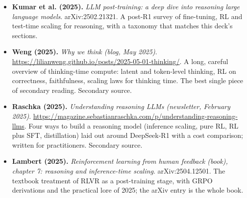 \documentclass[11pt,letterpaper]{article}
\begin{document}
\begin{itemize}[leftmargin=1.2em,itemsep=3pt]
\item \textbf{Kumar et al. (2025).} \textit{LLM post-training: a deep dive into reasoning large language models}. arXiv:2502.21321. A post-R1 survey of fine-tuning, RL and test-time scaling for reasoning, with a taxonomy that matches this deck's sections.
\item \textbf{Weng (2025).} \textit{Why we think (blog, May 2025)}. \url{https://lilianweng.github.io/posts/2025-05-01-thinking/}. A long, careful overview of thinking-time compute: latent and token-level thinking, RL on correctness, faithfulness, scaling laws for thinking time. The best single piece of secondary reading. Secondary source.
\item \textbf{Raschka (2025).} \textit{Understanding reasoning LLMs (newsletter, February 2025)}. \url{https://magazine.sebastianraschka.com/p/understanding-reasoning-llms}. Four ways to build a reasoning model (inference scaling, pure RL, RL plus SFT, distillation) laid out around DeepSeek-R1 with a cost comparison; written for practitioners. Secondary source.
\item \textbf{Lambert (2025).} \textit{Reinforcement learning from human feedback (book), chapter 7: reasoning and inference-time scaling}. arXiv:2504.12501. The textbook treatment of RLVR as a post-training stage, with GRPO derivations and the practical lore of 2025; the arXiv entry is the whole book.
\end{itemize}
\end{document}
